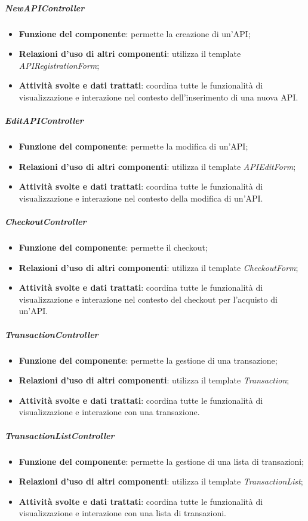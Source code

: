 \subparagraph{NewAPIController}
\begin{itemize}
	\item \textbf{Funzione del componente}: permette la creazione di un'API;
	\item \textbf{Relazioni d’uso di altri componenti}: utilizza il template \textit{APIRegistrationForm};
	\item \textbf{Attività svolte e dati trattati}: coordina tutte le funzionalità di visualizzazione e interazione nel contesto dell'inserimento di una nuova API.
\end{itemize}

\subparagraph{EditAPIController}
\begin{itemize}
	\item \textbf{Funzione del componente}: permette la modifica di un'API;
	\item \textbf{Relazioni d’uso di altri componenti}: utilizza il template \textit{APIEditForm};
	\item \textbf{Attività svolte e dati trattati}: coordina tutte le funzionalità di visualizzazione e interazione nel contesto della modifica di un'API.
\end{itemize}

\subparagraph{CheckoutController}
\begin{itemize}
	\item \textbf{Funzione del componente}: permette il checkout;
	\item \textbf{Relazioni d’uso di altri componenti}: utilizza il template \textit{CheckoutForm};
	\item \textbf{Attività svolte e dati trattati}: coordina tutte le funzionalità di visualizzazione e interazione nel contesto del checkout per l'acquisto di un'API.
\end{itemize}

\subparagraph{TransactionController}
\begin{itemize}
	\item \textbf{Funzione del componente}: permette la gestione di una transazione;
	\item \textbf{Relazioni d’uso di altri componenti}: utilizza il template \textit{Transaction};
	\item \textbf{Attività svolte e dati trattati}: coordina tutte le funzionalità di visualizzazione e interazione con una transazione.
\end{itemize}

\subparagraph{TransactionListController}
\begin{itemize}
	\item \textbf{Funzione del componente}: permette la gestione di una lista di transazioni;
	\item \textbf{Relazioni d’uso di altri componenti}: utilizza il template \textit{TransactionList};
	\item \textbf{Attività svolte e dati trattati}: coordina tutte le funzionalità di visualizzazione e interazione con una lista di transazioni.
\end{itemize}

